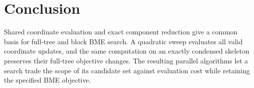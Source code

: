\documentclass[11pt,a4paper]{article}
\makeatletter
\DeclareRobustCommand{\_}{\ifmmode\nfss@text{\textunderscore}\else\textunderscore\allowbreak\fi}
\theoremstyle{definition}
\makeatother
\begin{document}
\section{Conclusion}

Shared coordinate evaluation and exact component reduction give a common basis for full-tree and block BME search.
A quadratic sweep evaluates all valid coordinate updates, and the same computation on an exactly condensed skeleton preserves their full-tree objective changes.
The resulting parallel algorithms let a search trade the scope of its candidate set against evaluation cost while retaining the specified BME objective.



\clearpage
\appendix

\end{document}
